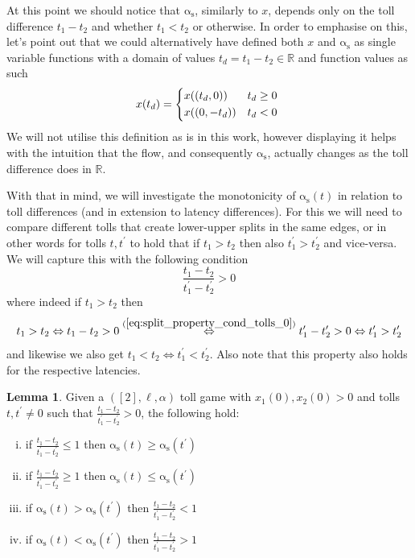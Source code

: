 \documentclass[10pt,a4paper]{book}
\newcommand{\LeftrightarrowArg}[1]{\stackrel{#1}{\Leftrightarrow}}
\newcommand{\as}{\mathrm{\alpha_s}}
\newcommand{\R}{\mathbb{R}}
\theoremstyle{definition}
\newtheorem{lemma}[definition]{Lemma}
\theoremstyle{comment}
\begin{document}
At this point we should notice that $\as$, similarly to $x$, depends only on the toll difference $t_1 - t_2$ and whether $t_1 < t_2$ or otherwise.
In order to emphasise on this, let's point out that we could alternatively have defined both $x$ and $\as$ as single variable functions with a domain of values $t_d = t_1 - t_2 \in \R$ and function values as such
\[
	x(t_d) =
	\begin{cases*}
		x((t_d, 0)) & $t_d \ge 0$ \\
		x((0, -t_d)) & $t_d < 0$ \\
	\end{cases*}
\]
We will not utilise this definition as is in this work, however displaying it helps with the intuition that the flow, and consequently $\as$, actually changes as the toll difference does in $\R$.

With that in mind, we will investigate the monotonicity of $\as(t)$ in relation to toll differences (and in extension to latency differences).
For this we will need to compare different tolls that create lower-upper splits in the same edges, or in other words for tolls $t, t^\prime$ to hold that if $t_1 > t_2$ then also $t_1^\prime > t_2^\prime$ and vice-versa.
We will capture this with the following condition
\begin{equation}
	\label{eq:split_property_cond_tolls_0}
	\frac{t_1 - t_2}{t_1^\prime - t_2^\prime} > 0
\end{equation}
where indeed if $t_1 > t_2$ then
\[t_1 > t_2 \Leftrightarrow t_1 - t_2 > 0 \LeftrightarrowArg{(\ref{eq:split_property_cond_tolls_0})} t_1^\prime - t_2^\prime > 0 \Leftrightarrow t_1^\prime > t_2^\prime\]
and likewise we also get $t_1 < t_2 \Leftrightarrow t_1^\prime < t_2^\prime$.
Also note that this property also holds for the respective latencies.

\begin{lemma}
	\label{lemma:split_monotonicity}
	Given a $([2], \ell, \alpha)$ toll game with $x_1(0), x_2(0) > 0$ and tolls $t, t^\prime \ne 0$ such that $\frac{t_1 - t_2}{t_1^\prime - t_2^\prime} > 0$, the following hold:
	\begin{enumerate}[(i)]
		\item if $\frac{t_1 - t_2}{t_1^\prime - t_2^\prime} \le 1$ then $\as(t) \ge \as(t^\prime)$
		\item if $\frac{t_1 - t_2}{t_1^\prime - t_2^\prime} \ge 1$ then $\as(t) \le \as(t^\prime)$
		\item if $\as(t) > \as(t^\prime)$ then $\frac{t_1 - t_2}{t_1^\prime - t_2^\prime} < 1$
		\item if $\as(t) < \as(t^\prime)$ then $\frac{t_1 - t_2}{t_1^\prime - t_2^\prime} > 1$
	\end{enumerate}
\end{lemma}
\end{document}
